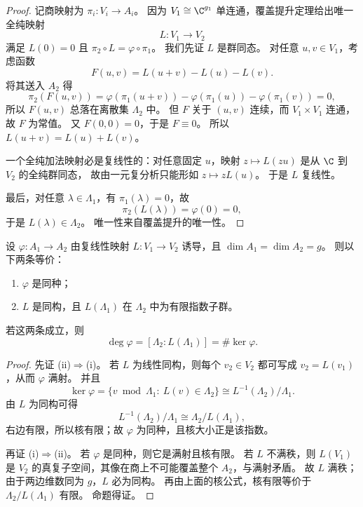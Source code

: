 \begin{proof}
记商映射为 $\pi_i:V_i\to A_i$。
因为 $V_1\cong \C^{g_1}$ 单连通，覆盖提升定理给出唯一全纯映射
\[
  L:V_1\to V_2
\]
满足 $L(0)=0$ 且 $\pi_2\circ L=\varphi\circ\pi_1$。
我们先证 $L$ 是群同态。
对任意 $u,v\in V_1$，考虑函数
\[
  F(u,v)=L(u+v)-L(u)-L(v).
\]
将其送入 $A_2$ 得
\[
  \pi_2(F(u,v))
  =\varphi(\pi_1(u+v))-
    \varphi(\pi_1(u))-
    \varphi(\pi_1(v))=0,
\]
所以 $F(u,v)$ 总落在离散集 $\Lambda_2$ 中。
但 $F$ 关于 $(u,v)$ 连续，而 $V_1\times V_1$ 连通，故 $F$ 为常值。
又 $F(0,0)=0$，于是 $F\equiv 0$。
所以 $L(u+v)=L(u)+L(v)$。

一个全纯加法映射必是复线性的：对任意固定 $u$，映射 $z\mapsto L(zu)$ 是从 $\C$ 到 $V_2$ 的全纯群同态，
故由一元复分析只能形如 $z\mapsto zL(u)$。
于是 $L$ 复线性。

最后，对任意 $\lambda\in\Lambda_1$，有 $\pi_1(\lambda)=0$，故
\[
  \pi_2(L(\lambda))=\varphi(0)=0,
\]
于是 $L(\lambda)\in\Lambda_2$。
唯一性来自覆盖提升的唯一性。
\end{proof}

\begin{proposition}[同种的格判别]
\label{prop:isogeny-lattice-criterion}
设 $\varphi:A_1\to A_2$ 由复线性映射 $L:V_1\to V_2$ 诱导，且 $\dim A_1=\dim A_2=g$。
则以下两条等价：
\begin{enumerate}
  \item[(i)] $\varphi$ 是同种；
  \item[(ii)] $L$ 是同构，且 $L(\Lambda_1)$ 在 $\Lambda_2$ 中为有限指数子群。
\end{enumerate}
若这两条成立，则
\[
  \deg \varphi=[\Lambda_2:L(\Lambda_1)]=\#\ker\varphi.
\]
\end{proposition}

\begin{proof}
先证 (ii)$\Rightarrow$(i)。
若 $L$ 为线性同构，则每个 $v_2\in V_2$ 都可写成 $v_2=L(v_1)$，从而 $\varphi$ 满射。
并且
\[
  \ker\varphi
  =\{v\bmod \Lambda_1:\ L(v)\in\Lambda_2\}
  \cong L^{-1}(\Lambda_2)/\Lambda_1.
\]
由 $L$ 为同构可得
\[
  L^{-1}(\Lambda_2)/\Lambda_1\cong \Lambda_2/L(\Lambda_1),
\]
右边有限，所以核有限；故 $\varphi$ 为同种，且核大小正是该指数。

再证 (i)$\Rightarrow$(ii)。
若 $\varphi$ 是同种，则它是满射且核有限。
若 $L$ 不满秩，则 $L(V_1)$ 是 $V_2$ 的真复子空间，其像在商上不可能覆盖整个 $A_2$，与满射矛盾。
故 $L$ 满秩；由于两边维数同为 $g$，$L$ 必为同构。
再由上面的核公式，核有限等价于 $\Lambda_2/L(\Lambda_1)$ 有限。
命题得证。
\end{proof}

